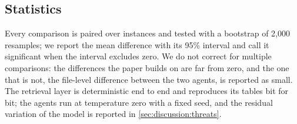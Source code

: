 \subsection{Statistics}
\label{sec:setup:stats}

Every comparison is paired over instances and tested with a bootstrap
of 2{,}000 resamples; we report the mean difference with its 95\%
interval and call it significant when the interval excludes zero. We do
not correct for multiple comparisons: the differences the paper builds
on are far from zero, and the one that is not, the file-level
difference between the two agents, is reported as small. The retrieval
layer is deterministic end to end and reproduces its tables bit for
bit; the agents run at temperature zero with a fixed seed, and the
residual variation of the model is reported in
\cref{sec:discussion:threats}.
